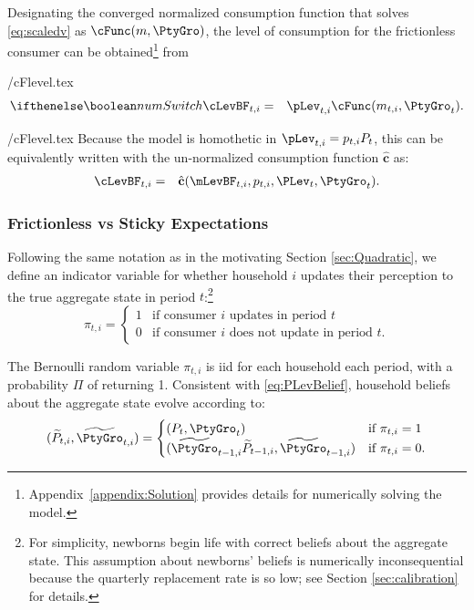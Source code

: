 \documentclass[titlepage]{\econtex}\newcommand{\texname}{cAndCwithStickyE}
\begin{document}
Designating the converged normalized consumption function that solves \eqref{eq:scaledv} as
$\cFunc(m,\PtyGro)$, the level of consumption for the frictionless consumer can be obtained\footnote{Appendix~\ref{appendix:Solution}
provides details for numerically solving the model.} from
\begin{verbatimwrite}{\eq/cFlevel.tex}
\begin{eqnarray}
  \label{eq:cFlevel}
\ifnumSw  \cLevBF_{t,i} & = & \pLev_{t,i} \cFunc(m_{t,i},\PtyGro_t)  \nonumber
.
\end{eqnarray}
\end{verbatimwrite}
 {\eq/cFlevel.tex}
Because the model is homothetic in $\pLev_{t,i}={p}_{t,i} {P}_{t}$, this can be equivalently written with the un-normalized consumption function $\hat{\textbf{c}}$ as:
\begin{eqnarray*}
\cLevBF_{t,i} & = & \hat{\textbf{c}}(\mLevBF_{t,i}, p_{t,i}, {\PLev}_t, {\PtyGro}_t).
\end{eqnarray*}

\subsubsection{Frictionless vs Sticky Expectations}\label{sec:StickySOE}

Following the same notation as in the motivating Section \ref{sec:Quadratic}, we define an indicator variable for whether household $i$ updates their perception to the true aggregate state in period $t$:\footnote{For simplicity, newborns begin life with correct beliefs about the aggregate state.  This assumption about newborns' beliefs is numerically inconsequential because the quarterly replacement rate is so low; see Section \ref{sec:calibration} for details.}
\begin{equation*}
\pi_{t,i} =
\begin{cases}
   1 & \text{if consumer $i$ updates in period $t$}
\\ 0 & \text{if consumer $i$ does not update in period $t$}.
\end{cases}
\end{equation*}

The Bernoulli random variable $\pi_{t,i}$ is iid for each household each period, with a probability $\Pi$ of returning 1.  Consistent with \eqref{eq:PLevBelief}, household beliefs about the aggregate state evolve according to:
\begin{equation}\label{eq:PLevBeliefSOE}
(\perc{P}_{t,i},\perc{\PtyGro}_{t,i}) = \begin{cases}
(P_t, \PtyGro_t) & \text{if } \pi_{t,i} = 1 \\
(\perc{\PtyGro}_{t-1,i} \perc{P}_{t-1,i} , \perc{\PtyGro}_{t-1,i} ) & \text{if } \pi_{t,i} = 0.
\end{cases}
\end{equation}
\end{document}
